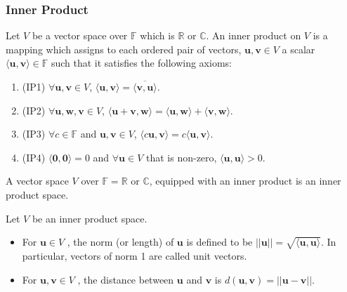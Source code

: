 \documentclass[a4paper]{article}
\begin{document}
\subsubsection*{Inner Product}
\begin{defi}
Let $V$ be a vector space over $\mathbb{F}$ which is $\mathbb{R}$ or $\mathbb{C}$. An inner product on $V$ is a mapping which assigns to each ordered pair of vectors, $\mathbf{u},\mathbf{v}\in V$ a scalar $\langle\mathbf{u},\mathbf{v}\rangle\in\mathbb{F}$ such that it satisfies the following axioms:
\begin{enumerate}
    \item (IP1) $\forall\mathbf{u},\mathbf{v}\in V$, $\langle\mathbf{u},\mathbf{v}\rangle=\overline{\langle\mathbf{v},\mathbf{u}\rangle}$.
    \item (IP2) $\forall\mathbf{u},\mathbf{w},\mathbf{v}\in V$, $\langle\mathbf{u}+\mathbf{v},\mathbf{w}\rangle=\langle\mathbf{u},\mathbf{w}\rangle+\langle\mathbf{v},\mathbf{w}\rangle$.
    \item (IP3) $\forall c\in\mathbb{F}$ and $\mathbf{u},\mathbf{v}\in V$, $\langle c\mathbf{u},\mathbf{v}\rangle=c\langle\mathbf{u},\mathbf{v}\rangle$.
    \item (IP4) $\langle\boldsymbol{0},\boldsymbol{0}\rangle=0$ and $\forall\mathbf{u}\in V$ that is non-zero, $\langle\mathbf{u},\mathbf{u}\rangle>0$.
\end{enumerate}
\end{defi}
\begin{defi}
A vector space $V$ over $\mathbb{F}=\mathbb{R}$ or $\mathbb{C}$, equipped with an inner product is an inner product space.
\end{defi}
\begin{defi}
Let $V$ be an inner product space. 
\begin{itemize}
\item For $\mathbf{u}\in V$ , the norm (or length) of $\mathbf{u}$ is defined to be $||\mathbf{u}|| =\sqrt{\langle\mathbf{u},\mathbf{u}\rangle}$. In particular, vectors of norm 1 are called unit vectors.
\item For $\mathbf{u},\mathbf{v}\in V$ , the distance between $\mathbf{u}$ and $\mathbf{v}$ is $d(\mathbf{u},\mathbf{v}) = ||\mathbf{u}−\mathbf{v}||$.
\end{itemize}
\end{defi}
\end{document}
